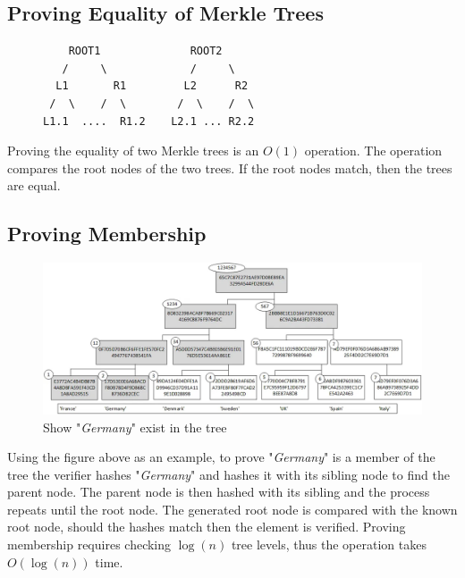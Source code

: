 \documentclass[12pt]{article}
\begin{document}
\subsection{Proving Equality of Merkle Trees}

\begin{figure}[H]
	\begin{center}
		\begin{verbatim}
    ROOT1              ROOT2
   /     \             /     \
  L1       R1         L2      R2
 /  \    /  \        /  \    /  \     
L1.1  ....  R1.2    L2.1 ... R2.2
		\end{verbatim}
	\end{center}
\end{figure}

Proving the equality of two Merkle trees is an $O(1)$ operation. The operation compares the root nodes of the two trees. If the root nodes match, then the trees are equal. 


\subsection{Proving Membership}

\begin{figure}[H]
	\centering
	\includegraphics[width=.8\textwidth]{../Images/merkle-example.png}
	\caption{Show "\textit{Germany}" exist in the tree\cite{buchannen_2022}}
\end{figure}

Using the figure above as an example, to prove  "\textit{Germany}" is a member of the tree the verifier hashes "\textit{Germany}" and hashes it with its sibling node to find the parent node. The parent node is then hashed with its sibling and the process repeats until the root node. The generated root node is compared with the known root node, should the hashes match then the element is verified. Proving membership requires checking $\log(n)$ tree levels, thus the operation takes $O(\log(n))$ time. 
\end{document}
